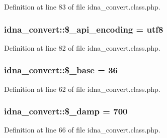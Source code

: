Definition at line 83 of file idna\+\_\+convert.\+class.\+php.

\hypertarget{classidna__convert_abc9b2aaad4b02a40602f254ac44ab973}{}
\subsubsection[{\$\+\_\+api\+\_\+encoding}]{\setlength{\rightskip}{0pt plus 5cm}idna\+\_\+convert\+::\$\+\_\+api\+\_\+encoding = \textquotesingle{}utf8\textquotesingle{}\hspace{0.3cm}{\ttfamily [protected]}}\label{classidna__convert_abc9b2aaad4b02a40602f254ac44ab973}


Definition at line 82 of file idna\+\_\+convert.\+class.\+php.

\hypertarget{classidna__convert_ae8b8b5bddd4d164dea30f7097274ac24}{}
\subsubsection[{\$\+\_\+base}]{\setlength{\rightskip}{0pt plus 5cm}idna\+\_\+convert\+::\$\+\_\+base = 36\hspace{0.3cm}{\ttfamily [protected]}}\label{classidna__convert_ae8b8b5bddd4d164dea30f7097274ac24}


Definition at line 62 of file idna\+\_\+convert.\+class.\+php.

\hypertarget{classidna__convert_af291107adc3fc7062e734fe5654a5b4c}{}
\subsubsection[{\$\+\_\+damp}]{\setlength{\rightskip}{0pt plus 5cm}idna\+\_\+convert\+::\$\+\_\+damp = 700\hspace{0.3cm}{\ttfamily [protected]}}\label{classidna__convert_af291107adc3fc7062e734fe5654a5b4c}


Definition at line 66 of file idna\+\_\+convert.\+class.\+php.

\hypertarget{classidna__convert_ae3825ac4f637ed992ef96f261647c396}{}
